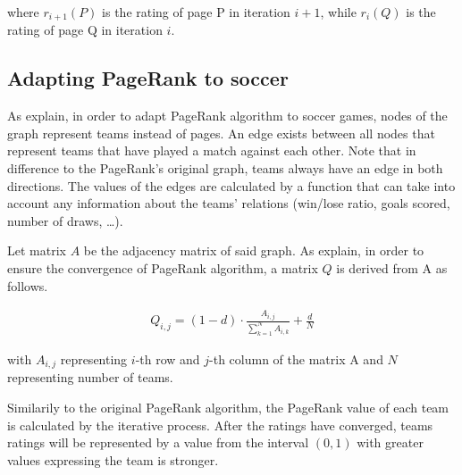 \noindent where $r_{i+1}(P)$ is the rating of page P in iteration $i+1$, while $r_i(Q)$ is the rating of page Q in iteration $i$.

\subsection{Adapting PageRank to soccer}
As \citet{LazovaPageRankApproachRanking2015} explain, in order to adapt PageRank algorithm to soccer games, nodes of the graph represent teams instead of pages. An edge exists between all nodes that represent teams that have played a match against each other. Note that in difference to the PageRank's original graph, teams always have an edge in both directions. The values of the edges are calculated by a function that can take into account any information about the teams' relations (win/lose ratio, goals scored, number of draws, \dots).

Let matrix $A$ be the adjacency matrix of said graph. As \citet{GOVANRANKINGNATIONALFOOTBALL} explain, in order to ensure the convergence of PageRank algorithm, a matrix $Q$ is derived from A as follows.

\begin{align}
\label{eq:a_to_q}
Q_{i,j} = (1-d)\cdot \frac{A_{i,j}}{\sum_{k=1}^{N} A_{i,k}} + \frac{d}{N}
\end{align}

\noindent with $A_{i,j}$ representing $i$-th row and $j$-th column of the matrix A and $N$ representing number of teams.

Similarily to the original PageRank algorithm, the PageRank value of each team is calculated by the iterative process. After the ratings have converged, teams ratings will be represented by a value from the interval $(0, 1)$ with greater values expressing the team is stronger.

